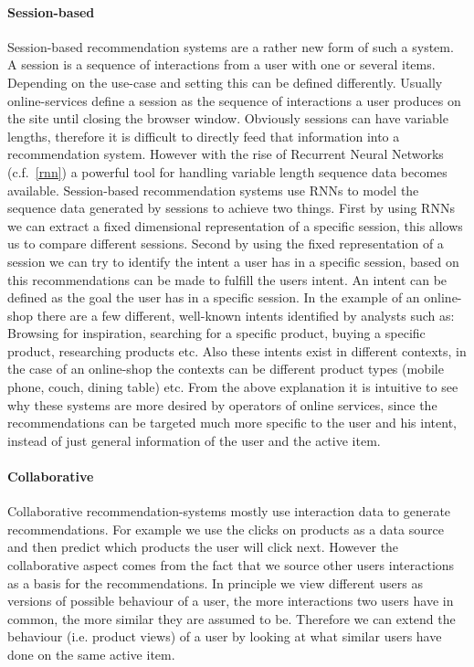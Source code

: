 \paragraph{Session-based}
Session-based recommendation systems are a rather new form of such a system.
A session is a sequence of interactions from a user with one or several items.
Depending on the use-case and setting this can be defined differently.
Usually online-services define a session as the sequence of interactions a user produces on the site until closing the browser window.
Obviously sessions can have variable lengths, therefore it is difficult to directly feed that information into a recommendation system.
However with the rise of Recurrent Neural Networks (c.f.~\ref{rnn}) a powerful tool for handling variable length sequence data becomes available.
Session-based recommendation systems use RNNs to model the sequence data generated by sessions to achieve two things.
First by using RNNs we can extract a fixed dimensional representation of a specific session, this allows us to compare different sessions.
Second by using the fixed representation of a session we can try to identify the intent a user has in a specific session, based on this recommendations can be made to fulfill the users intent.
An intent can be defined as the goal the user has in a specific session.
In the example of an online-shop there are a few different, well-known intents identified by analysts such as: Browsing for inspiration, searching for a specific product, buying a specific product, researching products etc.
Also these intents exist in different contexts, in the case of an online-shop the contexts can be different product types (mobile phone, couch, dining table) etc.
From the above explanation it is intuitive to see why these systems are more desired by operators of online services, since the recommendations can be targeted much more specific to the user and his intent, instead of just general information of the user and the active item. 
\paragraph{Collaborative}
Collaborative recommendation-systems mostly use interaction data to generate recommendations.
For example we use the clicks on products as a data source and then predict which products the user will click next.
However the collaborative aspect comes from the fact that we source other users interactions as a basis for the recommendations.
In principle we view different users as versions of possible behaviour of a user, the more interactions two users have in common, the more similar they are assumed to be.
Therefore we can extend the behaviour (i.e. product views) of a user by looking at what similar users have done on the same active item.
